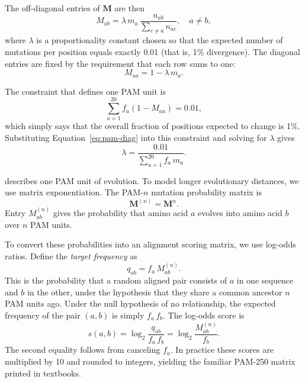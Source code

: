 The off-diagonal entries of $\mathbf{M}$ are then
\begin{equation}
  \label{eq:pam-off-diag}
  M_{ab} = \lambda \, m_a \, \frac{n_{ab}}{\sum_{c \neq a} n_{ac}}, \quad a \neq b,
\end{equation}
where $\lambda$ is a proportionality constant chosen so that the expected number of mutations per position equals exactly 0.01 (that is, 1\% divergence). The diagonal entries are fixed by the requirement that each row sums to one:
\begin{equation}
  \label{eq:pam-diag}
  M_{aa} = 1 - \lambda \, m_a.
\end{equation}

The constraint that defines one PAM unit is
\begin{equation}
  \label{eq:pam-constraint}
  \sum_{a=1}^{20} f_a \left(1 - M_{aa}\right) = 0.01,
\end{equation}
which simply says that the overall fraction of positions expected to change is 1\%. Substituting Equation~\eqref{eq:pam-diag} into this constraint and solving for $\lambda$ gives
\begin{equation}
  \label{eq:pam-lambda}
  \lambda = \frac{0.01}{\sum_{a=1}^{20} f_a \, m_a}.
\end{equation}

 describes one PAM unit of evolution. To model longer evolutionary distances, we use matrix exponentiation. The PAM-$n$ mutation probability matrix is
\begin{equation}
  \label{eq:pam-n}
  \mathbf{M}^{(n)} = \mathbf{M}^n.
\end{equation}
Entry $M^{(n)}_{ab}$ gives the probability that amino acid $a$ evolves into amino acid $b$ over $n$ PAM units.

To convert these probabilities into an alignment scoring matrix, we use log-odds ratios. Define the \emph{target frequency} as
\begin{equation}
  \label{eq:target-freq}
  q_{ab} = f_a \, M^{(n)}_{ab}.
\end{equation}
This is the probability that a random aligned pair consists of $a$ in one sequence and $b$ in the other, under the hypothesis that they share a common ancestor $n$ PAM units ago. Under the null hypothesis of no relationship, the expected frequency of the pair $(a,b)$ is simply $f_a \, f_b$. The log-odds score is
\begin{equation}
  \label{eq:pam-log-odds}
  s(a,b) = \log_2 \frac{q_{ab}}{f_a \, f_b} = \log_2 \frac{M^{(n)}_{ab}}{f_b}.
\end{equation}
The second equality follows from canceling $f_a$. In practice these scores are multiplied by 10 and rounded to integers, yielding the familiar PAM-250 matrix printed in textbooks.


